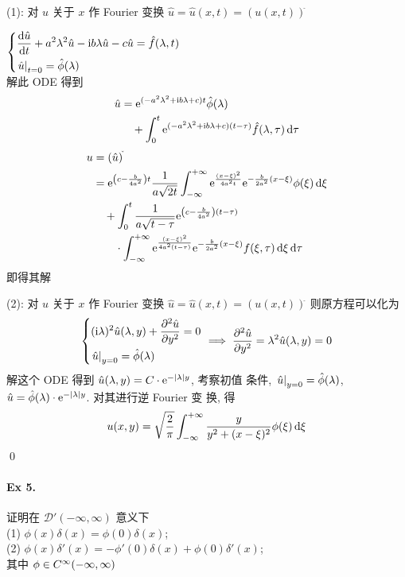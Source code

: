 \begin{solution}
(1): 对 $u$ 关于 $x$ 作 Fourier 变换 $\hat u=\hat u(x, t)=(u(x, t))^{\hat{}}$

$\begin{dcases}
{\frac{\operatorname{d\!}{\hat u}}{\operatorname{d\!}{t}}} +a^2\lambda^2\hat u -{\mathrm i} b\lambda\hat u -c\hat u
    =\hat f(\lambda, t) \\
{\left.{\hat u} \right|}_{t=0} = \hat\phi(\lambda)
\end{dcases}$\\
解此 ODE 得到
\begin{align*}
\hat u &= {\mathrm e}^{(-a^2\lambda^2 + {\mathrm i} b \lambda + c)t} \hat\phi(\lambda) \\
&\quad+ \int_0^t {\mathrm e}^{(-a^2\lambda^2 + {\mathrm i} b \lambda + c)(t - \tau)}
    \hat f(\lambda, \tau) \operatorname{d\!} \tau
\end{align*}
\begin{align*}
u &= (\hat u)^{\check{}} \\
&= {\mathrm e}^{{\left( {c-\frac{b}{4a^2}} \right)}t} \frac1{a\sqrt{2t}}
    \int_{-\infty}^{+\infty} {\mathrm e}^{\frac{(x - \xi)^2}{4a^2t}}
    {\mathrm e}^{-\frac{b}{2a^2}(x-\xi)} \phi(\xi) \operatorname{d\!} \xi \\
&\quad+ \int_0^{t} \frac1{a\sqrt{t-\tau}}
    {\mathrm e}^{{\left( {c-\frac{b}{4a^2}} \right)}(t-\tau)} \\
    &\quad\quad\cdot \int_{-\infty}^{+\infty}
	    {\mathrm e}^{\frac{(x - \xi)^2}{4a^2(t-\tau)}}
        {\mathrm e}^{-\frac{b}{2a^2}(x-\xi)} f(\xi, \tau) \operatorname{d\!} \xi \operatorname{d\!} \tau
\end{align*}
即得其解

\noindent (2): 对 $u$ 关于 $x$ 作 Fourier 变换
$\hat u = \hat u(x, t) = (u(x, t))^{\hat{}}$ 则原方程可以化为
\[ {\left\{ \begin{aligned} 
& ({\mathrm i}\lambda)^2 \hat u(\lambda, y)	+ {\frac{\partial {^2\hat u}}{\partial {y^2}}} = 0 \\
& {\left.{\hat u} \right|}_{y=0} = \hat \phi(\lambda)
 \end{aligned} \right.} \implies {\frac{\partial {^2\hat u}}{\partial {y^2}}} = \lambda^2\hat u(\lambda, y) = 0\]
解这个 ODE 得到 $\hat u(\lambda, y) = C \cdot {\mathrm e}^{-{\lvert {\lambda} \rvert} y}$, 考察初值
条件, ${\left.{\hat u} \right|}_{y=0} = \hat\phi(\lambda)$,
$\hat u = \hat\phi(\lambda) \cdot {\mathrm e}^{-{\lvert {\lambda} \rvert}y}$. 对其进行逆 Fourier 变
换, 得
\[
u(x, y) = \sqrt{\frac{2}{\pi}} \int_{-\infty}^{+\infty} \frac{y}{y^2+(x-\xi)^2}
\phi(\xi) \operatorname{d\!} \xi
\]
\qed
\end{solution}
\paragraph{Ex 5.}
证明在 $\mathcal D'(-\infty, \infty)$ 意义下 \\
(1) $\phi(x)\delta(x) = \phi(0)\delta(x)$; \\
(2) $\phi(x)\delta'(x) = -\phi'(0)\delta(x) + \phi(0)\delta'(x)$; \\
其中 $\phi \in C{^\infty(-\infty, \infty)}$

